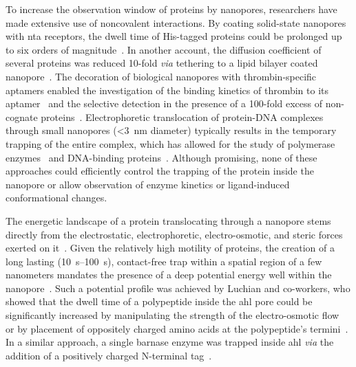 To increase the observation window of proteins by nanopores, researchers have made extensive use of
noncovalent interactions. By coating solid-state nanopores with \gls{nta} receptors, the dwell time of
His-tagged proteins could be prolonged up to six orders of magnitude~\cite{Wei-2012}. In another account, the
diffusion coefficient of several proteins was reduced 10-fold \textit{via} tethering to a lipid bilayer coated
nanopore~\cite{Yusko-2011,Yusko-2016}. The decoration of biological nanopores with thrombin-specific aptamers
enabled the investigation of the binding kinetics of thrombin to its aptamer~\cite{Rotem-2012} and the
selective detection in the presence of a 100-fold excess of non-cognate proteins~\cite{Soskine-2012}.
Electrophoretic translocation of protein-DNA complexes through small nanopores (\SI{<3}{\nm} diameter)
typically results in the temporary trapping of the entire complex, which has allowed for the study of
polymerase enzymes~\cite{Lieberman-2010,Derrington-2015} and DNA-binding
proteins~\cite{Squires-2015,Yang-2018}. Although promising, none of these approaches could efficiently control
the trapping of the protein inside the nanopore or allow observation of enzyme kinetics or ligand-induced
conformational changes.

The energetic landscape of a protein translocating through a nanopore stems directly from the electrostatic,
electrophoretic, electro-osmotic, and steric forces exerted on it~\cite{Muthukumar-2014}. Given the relatively
high motility of proteins, the creation of a long lasting (\SIrange{10}{100}{\second}), contact-free trap
within a spatial region of a few nanometers mandates the presence of a deep potential energy well within the
nanopore~\cite{Movileanu-2005}. Such a potential profile was achieved by Luchian and co-workers, who showed
that the dwell time of a polypeptide inside the \gls{ahl} pore could be significantly increased by
manipulating the strength of the electro-osmotic flow~\cite{Mereuta-2014,Asandei-2016} or by placement of
oppositely charged amino acids at the polypeptide's termini~\cite{Asandei-2015}. In a similar approach, a
single barnase enzyme was trapped inside \gls{ahl} \textit{via} the addition of a positively charged
N-terminal tag~\cite{Mohammad-2008}.

